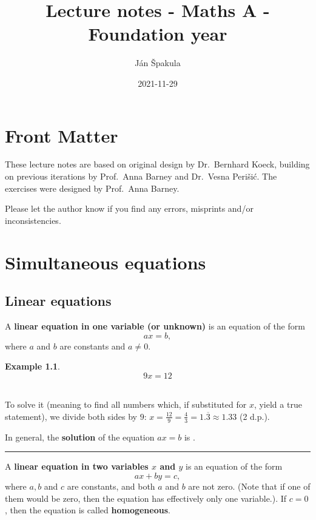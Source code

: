 \documentclass[
  12pt,
  oneside]{book}
\title{Lecture notes - Maths A - Foundation year}
\author{Ján Špakula}
\date{2021-11-29}
\theoremstyle{definition}
\theoremstyle{definition}
\newtheorem{example}{Example}[chapter]
\theoremstyle{definition}
\theoremstyle{definition}
\theoremstyle{remark}
\begin{document}
\maketitle

{
\setcounter{tocdepth}{1}
\tableofcontents
}
\hypertarget{front-matter}{%
\chapter*{Front Matter}\label{front-matter}}

These lecture notes are based on original design by Dr.~Bernhard Koeck, building on previous iterations by Prof.~Anna Barney and Dr.~Vesna Perišić. The exercises were designed by Prof.~Anna Barney.

Please let the author know if you find any errors, misprints and/or inconsistencies.

\hypertarget{simeq}{%
\chapter{Simultaneous equations}\label{simeq}}

\hypertarget{linear-equations}{%
\section{Linear equations}\label{linear-equations}}

A \textbf{linear equation in one variable (or unknown)} is an equation of the form
\[ax=b,\]
where \(a\) and \(b\) are constants and \(a\neq 0\).

\begin{example}
\protect\hypertarget{exm:unnamed-chunk-3}{}{\label{exm:unnamed-chunk-3} }\[9x=12\]\\
\end{example}
To solve it (meaning to find all numbers which, if substituted for \(x\), yield a true statement), we divide both sides by \(9\): \(x = \frac{12}{9} = \frac{4}{3} = 1.\overline{3} \approx 1.33\) (2 d.p.).

In general, the \textbf{solution} of the equation \(ax=b\) is .

\begin{center}\rule{0.5\linewidth}{0.5pt}\end{center}

A \textbf{linear equation in two variables \(x\) and \(y\)} is an equation of the form
\[ax+by=c,\]
where \(a,b\) and \(c\) are constants, and both \(a\) and \(b\) are not zero. (Note that if one of them would be zero, then the equation has effectively only one variable.). If \(c=0\), then the equation is called \textbf{homogeneous}.
\end{document}
